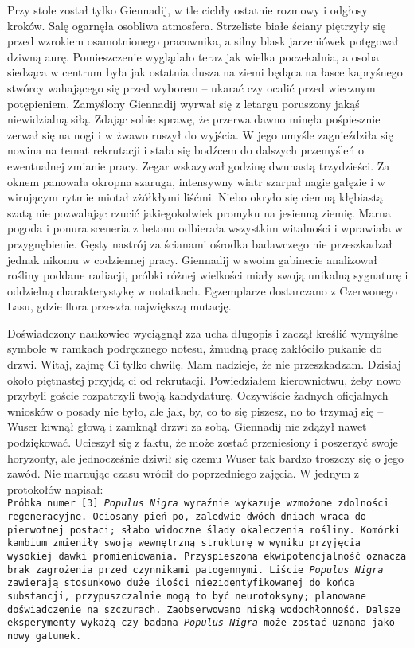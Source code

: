 \documentclass[../MAIN.tex]{subfiles}
\begin{document}
Przy stole został tylko Giennadij, w tle cichły ostatnie rozmowy i odgłosy kroków. Salę ogarnęła osobliwa atmosfera. Strzeliste białe ściany piętrzyły się przed wzrokiem osamotnionego pracownika, a silny blask jarzeniówek potęgował dziwną aurę. Pomieszczenie wyglądało teraz jak wielka poczekalnia, a osoba siedząca w centrum była jak ostatnia dusza na ziemi będąca na łasce kapryśnego stwórcy wahającego się przed wyborem -- ukarać czy ocalić przed wiecznym potępieniem. Zamyślony Giennadij wyrwał się z letargu poruszony jakąś niewidzialną siłą. Zdając sobie sprawę, że przerwa dawno minęła pośpiesznie zerwał się na nogi i w żwawo ruszył do wyjścia. W jego umyśle zagnieździła się nowina na temat rekrutacji i stała się bodźcem do dalszych przemyśleń o ewentualnej zmianie pracy. Zegar wskazywał godzinę dwunastą trzydzieści.
%
% 
Za oknem panowała okropna szaruga, intensywny wiatr szarpał nagie gałęzie i w wirującym rytmie miotał zżółkłymi liśćmi. Niebo okryło się ciemną kłębiastą szatą nie pozwalając rzucić jakiegokolwiek promyku na jesienną ziemię. Marna pogoda i ponura sceneria z betonu odbierała wszystkim witalności i wprawiała w przygnębienie. Gęsty nastrój za ścianami ośrodka badawczego nie przeszkadzał jednak nikomu w codziennej pracy. Giennadij w swoim gabinecie analizował rośliny poddane radiacji, próbki różnej wielkości miały swoją unikalną sygnaturę i oddzielną charakterystykę w notatkach. Egzemplarze dostarczano z Czerwonego Lasu, gdzie flora przeszła największą mutację. 

Doświadczony naukowiec wyciągnął zza ucha długopis i zaczął kreślić wymyślne symbole w ramkach podręcznego notesu, żmudną pracę zakłóciło pukanie do drzwi. 
\sx Witaj, zajmę Ci tylko chwilę. Mam nadzieje, że nie przeszkadzam. Dzisiaj około piętnastej przyjdą ci od rekrutacji. Powiedziałem kierownictwu, żeby nowo przybyli goście rozpatrzyli twoją kandydaturę. Oczywiście żadnych oficjalnych wniosków o posady nie było, ale jak, by, co to się piszesz, no to trzymaj się -- Wuser kiwnął głową i zamknął drzwi za sobą.
\qd
Giennadij nie zdążył nawet podziękować. Ucieszył się z faktu, że może zostać przeniesiony i poszerzyć swoje horyzonty, ale jednocześnie dziwił się czemu Wuser tak bardzo troszczy się o jego zawód. Nie marnując czasu wrócił do poprzedniego zajęcia. W jednym z protokołów napisał:\\
% 
\texttt{Próbka numer [3] \textit{Populus Nigra} wyraźnie wykazuje wzmożone zdolności regeneracyjne. Ociosany pień po, zaledwie dwóch dniach wraca do pierwotnej postaci; słabo widoczne ślady okaleczenia rośliny. Komórki kambium zmieniły swoją wewnętrzną strukturę w wyniku przyjęcia wysokiej dawki promieniowania. Przyspieszona ekwipotencjalność oznacza brak zagrożenia przed czynnikami patogennymi. Liście \textit{Populus Nigra} zawierają stosunkowo duże ilości niezidentyfikowanej do końca substancji, przypuszczalnie mogą to być neurotoksyny; planowane doświadczenie na szczurach. Zaobserwowano niską wodochłonność. Dalsze eksperymenty wykażą czy badana \textit{Populus Nigra} może zostać uznana jako nowy gatunek.} 
\end{document}
